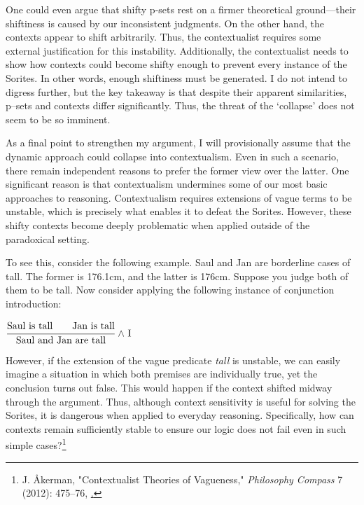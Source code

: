 One could even argue that shifty p-sets rest on a firmer theoretical
ground---their shiftiness is caused by our inconsistent judgments. On
the other hand, the contexts appear to shift arbitrarily. Thus, the
contextualist requires some external justification for this instability.
Additionally, the contextualist needs to show how contexts could become
shifty enough to prevent every instance of the Sorites. In other words,
enough shiftiness must be generated. I do not intend to digress further,
but the key takeaway is that despite their apparent similarities, p--sets
and contexts differ significantly. Thus, the threat of the `collapse'
does not seem to be so imminent.

As a final point to strengthen my argument, I will provisionally assume
that the dynamic approach could collapse into contextualism. Even in
such a scenario, there remain independent reasons to prefer the former
view over the latter. One significant reason is that contextualism
undermines some of our most basic approaches to reasoning. Contextualism
requires extensions of vague terms to be unstable, which is precisely
what enables it to defeat the Sorites. However, these shifty contexts
become deeply problematic when applied outside of the paradoxical
setting.

To see this, consider the following example. Saul and Jan are borderline
cases of tall. The former is 176.1cm, and the latter is 176cm. Suppose
you judge both of them to be tall. Now consider applying the following
instance of conjunction introduction:

\begin{center}
  $\cfrac{\text{Saul is tall} \hspace{2em} \text{Jan is tall}}
  {\text{Saul and Jan are tall}}  { \ \land  } \ \text{I} $
\end{center}
However, if the extension of the vague predicate \emph{tall} is
unstable, we can easily imagine a situation in which both premises are
individually true, yet the conclusion turns out false. This would happen
if the context shifted midway through the argument. Thus, although
context sensitivity is useful for solving the Sorites, it is dangerous
when applied to everyday reasoning. Specifically, how can contexts
remain sufficiently stable to ensure our logic does not fail even in
such simple cases?\footnote{J. Åkerman, "Contextualist Theories of
  Vagueness," \emph{Philosophy Compass} 7 (2012): 475--76,
  \href{https://doi.org/10.1111/j.1747-9991.2012.00495.x}.}

